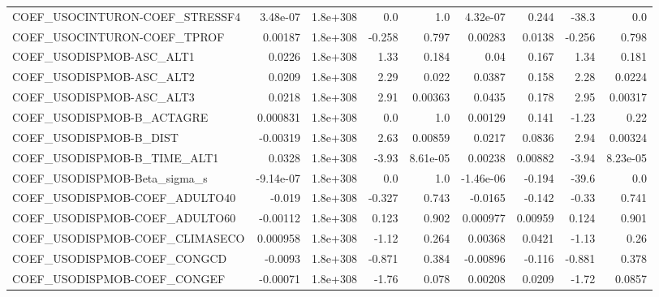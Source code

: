 \begin{tabular}{lrrrrrrrr}
COEF\_USOCINTURON-COEF\_STRESSF4    &    3.48e-07 &     1.8e+308 &     0.0 &      1.0 &   4.32e-07 &       0.244 &        -38.3 &           0.0 \\
COEF\_USOCINTURON-COEF\_TPROF       &     0.00187 &     1.8e+308 &  -0.258 &    0.797 &    0.00283 &      0.0138 &       -0.256 &         0.798 \\
COEF\_USODISPMOB-ASC\_ALT1          &      0.0226 &     1.8e+308 &    1.33 &    0.184 &       0.04 &       0.167 &         1.34 &         0.181 \\
COEF\_USODISPMOB-ASC\_ALT2          &      0.0209 &     1.8e+308 &    2.29 &    0.022 &     0.0387 &       0.158 &         2.28 &        0.0224 \\
COEF\_USODISPMOB-ASC\_ALT3          &      0.0218 &     1.8e+308 &    2.91 &  0.00363 &     0.0435 &       0.178 &         2.95 &       0.00317 \\
COEF\_USODISPMOB-B\_ACTAGRE         &    0.000831 &     1.8e+308 &     0.0 &      1.0 &    0.00129 &       0.141 &        -1.23 &          0.22 \\
COEF\_USODISPMOB-B\_DIST            &    -0.00319 &     1.8e+308 &    2.63 &  0.00859 &     0.0217 &      0.0836 &         2.94 &       0.00324 \\
COEF\_USODISPMOB-B\_TIME\_ALT1       &      0.0328 &     1.8e+308 &   -3.93 & 8.61e-05 &    0.00238 &     0.00882 &        -3.94 &      8.23e-05 \\
COEF\_USODISPMOB-Beta\_sigma\_s      &   -9.14e-07 &     1.8e+308 &     0.0 &      1.0 &  -1.46e-06 &      -0.194 &        -39.6 &           0.0 \\
COEF\_USODISPMOB-COEF\_ADULTO40     &      -0.019 &     1.8e+308 &  -0.327 &    0.743 &    -0.0165 &      -0.142 &        -0.33 &         0.741 \\
COEF\_USODISPMOB-COEF\_ADULTO60     &    -0.00112 &     1.8e+308 &   0.123 &    0.902 &   0.000977 &     0.00959 &        0.124 &         0.901 \\
COEF\_USODISPMOB-COEF\_CLIMASECO    &    0.000958 &     1.8e+308 &   -1.12 &    0.264 &    0.00368 &      0.0421 &        -1.13 &          0.26 \\
COEF\_USODISPMOB-COEF\_CONGCD       &     -0.0093 &     1.8e+308 &  -0.871 &    0.384 &   -0.00896 &      -0.116 &       -0.881 &         0.378 \\
COEF\_USODISPMOB-COEF\_CONGEF       &    -0.00071 &     1.8e+308 &   -1.76 &    0.078 &    0.00208 &      0.0209 &        -1.72 &        0.0857 \\

\end{tabular}
